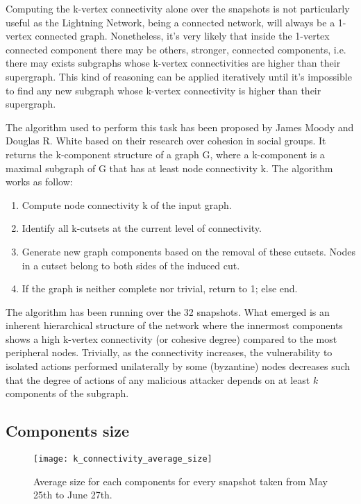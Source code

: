 	Computing the k-vertex connectivity alone over the snapshots is not particularly useful as the Lightning Network, being a connected network, will always be a 1-vertex connected graph. Nonetheless, it's very likely that inside the 1-vertex connected component there may be others, stronger, connected components, i.e. there may exists subgraphs whose k-vertex connectivities are higher than their supergraph. This kind of reasoning can be applied iteratively until it's impossible to find any new subgraph whose k-vertex connectivity is higher than their supergraph.
	
	The algorithm used to perform this task has been proposed by James Moody and Douglas R. White \cite{Moody2003} based on their research over cohesion in social groups. It returns the k-component structure of a graph G, where a k-component is a maximal subgraph of G that has at least node connectivity k. The algorithm works as follow:
	\begin{enumerate}
		\item Compute node connectivity k of the input graph.
		\item Identify all k-cutsets at the current level of connectivity. 
		\item Generate new graph components based on the removal of these cutsets. Nodes in a cutset belong to both sides of the induced cut.
		\item If the graph is neither complete nor trivial, return to 1; else end.
	\end{enumerate}
	
	The algorithm has been running over the 32 snapshots. What emerged is an inherent hierarchical structure of the network where the innermost components shows a high k-vertex connectivity (or cohesive degree) compared to the most peripheral nodes. Trivially, as the connectivity increases, the vulnerability to isolated actions performed unilaterally by some (byzantine) nodes decreases such that the degree of actions of any malicious attacker depends on at least $k$ components of the subgraph.
	
	\subsection{Components size}
	
	\begin{figure}[ht!]
		\texttt{[image: k\_connectivity\_average\_size]}\\
		\caption{Average size for each components for every snapshot taken from May 25th to June 27th.}
		\label{monthly_connectivity_average}
	\end{figure}
	

